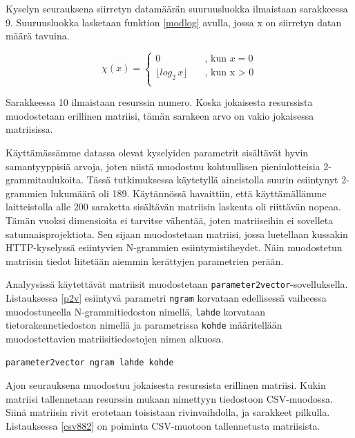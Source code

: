 Kyselyn seurauksena siirretyn datamäärän suuruusluokka ilmaistaan
sarakkeessa 9. Suuruusluokka lasketaan funktion \ref{modlog} avulla, jossa x
on siirretyn datan määrä tavuina.

\begin{equation} \label{modlog}
  \chi(x) = \left\{
  \begin{array}{ll}
    0 & \quad \text{, kun $x = 0$}\\
    \lfloor log_2 \, x \rfloor & \quad \text{, kun x > 0}\\
  \end{array} \right.
\end{equation}

\vskip 0.5cm
Sarakkeessa 10 ilmaistaan resurssin numero. Koska jokaisesta
resurssista muodostetaan erillinen matriisi, tämän sarakeen arvo on
vakio jokaisessa matriisissa.


Käyttämässämme datassa olevat kyselyiden parametrit sisältävät hyvin
samantyyppisiä arvoja, joten niistä muodostuu kohtuullisen
pieniulotteisia 2-\-grammitaulukoita. Tässä tutkimuksessa käytetyllä
aineistolla suurin esiintynyt 2-grammien lukumäärä oli
189. Käytännössä havaittiin, että käyttämällämme laitteistolla alle
200 saraketta sisältävän matriisin laskenta oli riittävän
nopeaa. Tämän vuoksi dimensioita ei tarvitse vähentää, joten matriiseihin ei sovelleta
satunnaisprojektiota. Sen sijaan muodostetaan matriisi, jossa
luetellaan kussakin HTTP-kyselyssä esiintyvien N-grammien
esiintymistiheydet. Näin muodostetun matriisin tiedot liitetään
aiemmin kerättyjen parametrien perään.

Analyysissä käytettävät matriisit muodostetaan
\texttt{parameter2vector}-\-sovelluksella. Listauksessa \ref{p2v}
esiintyvä parametri \texttt{ngram} korvataan edellisessä vaiheessa
muodostuneella N-\-grammitiedoston nimellä, \texttt{lahde} korvataan
tietorakennetiedoston nimellä ja parametrissa \texttt{kohde}
määritellään muodostettavien matriisitiedostojen nimen alkuosa.

\begin{lstlisting}[float=h,language=bashshell,label=p2v,aboveskip=0.5cm,caption=Matriisien
  muodostaminen.]
parameter2vector ngram lahde kohde
\end{lstlisting} 

Ajon seurauksena muodostuu jokaisesta resurssista erillinen
matriisi. Kukin matriisi tallennetaan resurssin mukaan nimettyyn
tiedostoon CSV-muodossa. Siinä matriisin rivit erotetaan toisistaan
rivinvaihdolla, ja sarakkeet pilkulla. Listauksessa \ref{csv882} on
poiminta CSV-muotoon tallennetusta matriisista.

